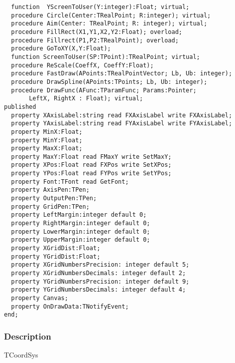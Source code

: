 \documentclass[12pt,a4paper,oneside]{report}
\begin{document}
\begin{verbatim}
  function  YScreenToUser(Y:integer):Float; virtual;
  procedure Circle(Center:TRealPoint; R:integer); virtual;
  procedure Aim(Center: TRealPoint; R: integer); virtual;
  procedure FillRect(X1,Y1,X2,Y2:Float); overload;
  procedure Fillrect(P1,P2:TRealPoint); overload;
  procedure GoToXY(X,Y:Float);
  function ScreenToUser(SP:TPoint):TRealPoint; virtual;
  procedure ReScale(CoeffX, CoeffY:Float);
  procedure FastDraw(APoints:TRealPointVector; Lb, Ub: integer);
  procedure DrawSpline(APoints:TPoints; Lb, Ub: integer);
  procedure DrawFunc(AFunc:TParamFunc; Params:Pointer; 
       LeftX, RightX : Float); virtual;
published                                    
  property XAxisLabel:string read FXAxisLabel write FXAxisLabel;
  property YAxisLabel:string read FYAxisLabel write FYAxisLabel;
  property MinX:Float; 
  property MinY:Float;
  property MaxX:Float;
  property MaxY:Float read FMaxY write SetMaxY;
  property XPos:Float read FXPos write SetXPos;
  property YPos:Float read FYPos write SetYPos;
  property Font:TFont read GetFont;
  property AxisPen:TPen;
  property OutputPen:TPen;
  property GridPen:TPen;
  property LeftMargin:integer default 0;
  property RightMargin:integer default 0;
  property LowerMargin:integer default 0;
  property UpperMargin:integer default 0;
  property XGridDist:Float;
  property YGridDist:Float;
  property XGridNumbersPrecision: integer default 5;
  property XGridNumbersDecimals: integer default 2;
  property YGridNumbersPrecision: integer default 9;
  property YGridNumbersDecimals: integer default 4;
  property Canvas;
  property OnDrawData:TNotifyEvent;
end;
\end{verbatim}
\subsubsection{Description}
TCoordSys
\end{document}
